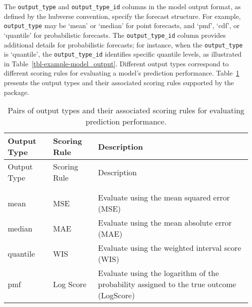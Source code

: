 \documentclass[
  article,
  shortnames,
  notitle]{jss}
\begin{document}
The \texttt{output\_type} and \texttt{output\_type\_id} columns in the
model output format, as defined by the hubverse convention, specify the
forecast structure. For example, \texttt{output\_type} may be `mean' or
`median' for point forecasts, and `pmf', `cdf', or `quantile' for
probabilistic forecasts. The \texttt{output\_type\_id} column provides
additional details for probabilistic forecasts; for instance, when the
\texttt{output\_type} is `quantile', the \texttt{output\_type\_id}
identifies specific quantile levels, as illustrated in
Table~\ref{tbl-example-model_output}. Different output types correspond
to different scoring rules for evaluating a model's prediction
performance. Table~\ref{tbl-pair-output-scoringrule} presents the output
types and their associated scoring rules supported by the
 package.

\begin{longtable}[]{@{}
  >{\raggedright\arraybackslash}p{}
  >{\raggedright\arraybackslash}p{}
  >{\raggedright\arraybackslash}p{}@{}}
\toprule\noalign{}
\begin{minipage}[b]{\linewidth}\raggedright
Output Type
\end{minipage} & \begin{minipage}[b]{\linewidth}\raggedright
Scoring Rule
\end{minipage} & \begin{minipage}[b]{\linewidth}\raggedright
Description
\end{minipage} \\
\midrule\noalign{}
\endfirsthead
\toprule\noalign{}
\begin{minipage}[b]{\linewidth}\raggedright
Output Type
\end{minipage} & \begin{minipage}[b]{\linewidth}\raggedright
Scoring Rule
\end{minipage} & \begin{minipage}[b]{\linewidth}\raggedright
Description
\end{minipage} \\
\midrule\noalign{}
\endhead
\bottomrule\noalign{}
\tabularnewline
\caption{Pairs of output types and their associated scoring rules for
evaluating prediction
performance.}\label{tbl-pair-output-scoringrule}\tabularnewline
\endlastfoot
mean & MSE & Evaluate using the mean squared error (MSE) \\
median & MAE & Evaluate using the mean absolute error (MAE) \\
quantile & WIS & Evaluate using the weighted interval score (WIS) \\
pmf & Log Score & Evaluate using the logarithm of the probability
assigned to the true outcome (LogScore) \\
\end{longtable}
\end{document}
